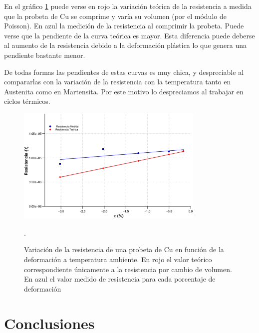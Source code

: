 \documentclass[a4paper,12pt,fleqn,twoside,openany]{book}
\begin{document}
En el gráfico \ref{fig:ResDefCu} puede verse en rojo la variación teórica de la resistencia a medida que la probeta de Cu se comprime y varía su volumen (por el módulo de Poisson).
En azul la medición de la resistencia al comprimir la probeta. Puede verse que la pendiente de la curva teórica es mayor. Esta diferencia puede deberse 
al aumento de la resistencia debido a la deformación plástica lo que genera una pendiente bastante menor.

De todas formas las pendientes de estas curvas es muy chica, y despreciable al compararlas con la variación de la resistencia con la temperatura tanto en Austenita 
como en Martensita. Por este motivo lo despreciamos al trabajar en ciclos térmicos.

\begin{figure}[h]
 \centering
 \includegraphics[width=0.8\textwidth]{Img/Resultados/ResDefCu.eps}
 \caption{Variación de la resistencia de una probeta de Cu en función de la deformación a temperatura ambiente. En rojo el valor teórico correspondiente únicamente a la resistencia por cambio de volumen. 
 En azul el valor medido de resistencia para cada porcentaje de deformación}. 
 \label{fig:ResDefCu}
 \end{figure}






\chapter{Conclusiones}
\end{document}
